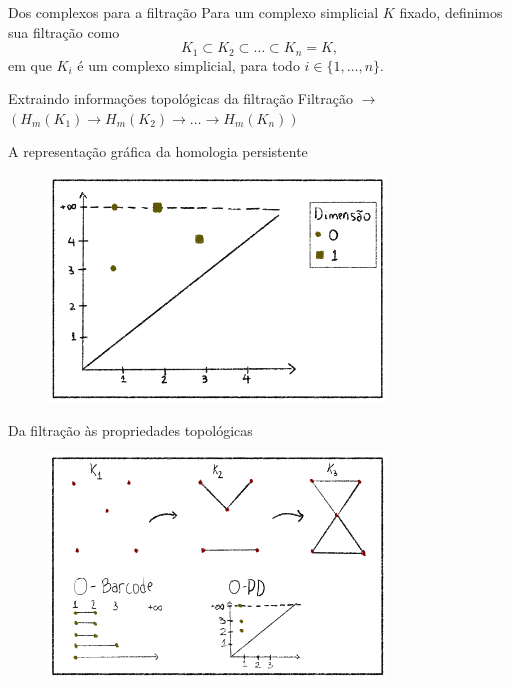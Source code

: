 \documentclass[10pt]{beamer}
\begin{document}
\begin{frame}{Dos complexos para a filtração}
    Para um complexo simplicial $K$ fixado, definimos sua filtração como 
    \begin{equation*}
        K_1 \subset K_2 \subset \dots \subset K_n = K,
    \end{equation*}
    em que $K_i$ é um complexo simplicial, para todo $i \in \{1, \dots, n\}$. 
\end{frame}

\begin{frame}{Extraindo informações topológicas da filtração}
    \centering
    {\Large Filtração $\rightarrow$ $(H_m(K_1) \to H_m(K_2) \to \dots \to H_m(K_n))$}
\end{frame}

\begin{frame}{A representação gráfica da homologia persistente} 
     \begin{figure}
        \centering
        \includegraphics[width=0.8\textwidth]{../images/persdiag_ex.png}
    \end{figure}   
\end{frame}

\begin{frame}{Da filtração às propriedades topológicas}
    \begin{figure}
        \centering
        \includegraphics[width=0.8\textwidth]{../images/filt_bar_pd.png}
    \end{figure}
\end{frame}
\end{document}
